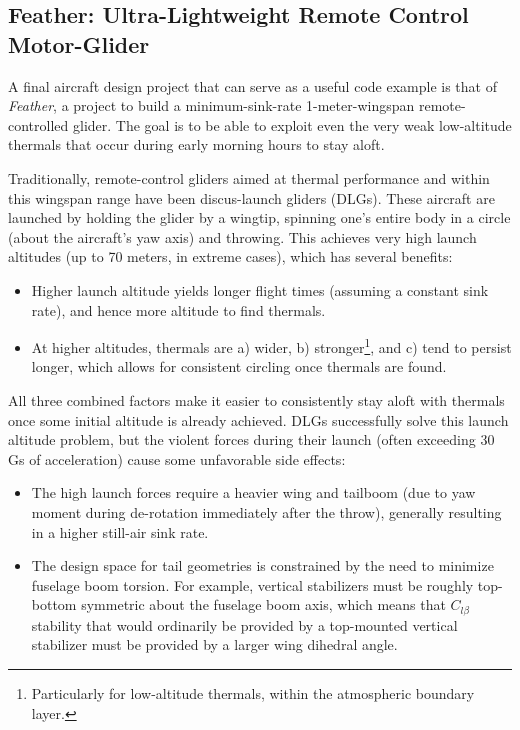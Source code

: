 \subsection{Feather: Ultra-Lightweight Remote Control Motor-Glider}
\label{sec:feather}

A final aircraft design project that can serve as a useful code example is that of \emph{Feather}, a project to build a minimum-sink-rate 1-meter-wingspan remote-controlled glider. The goal is to be able to exploit even the very weak low-altitude thermals that occur during early morning hours to stay aloft.

Traditionally, remote-control gliders aimed at thermal performance and within this wingspan range have been discus-launch gliders (DLGs). These aircraft are launched by holding the glider by a wingtip, spinning one's entire body in a circle (about the aircraft's yaw axis) and throwing. This achieves very high launch altitudes (up to 70 meters, in extreme cases), which has several benefits:
\begin{itemize}[noitemsep]
    \item Higher launch altitude yields longer flight times (assuming a constant sink rate), and hence more altitude to find thermals.
    \item At higher altitudes, thermals are a) wider, b) stronger\footnote{Particularly for low-altitude thermals, within the atmospheric boundary layer.}, and c) tend to persist longer, which allows for consistent circling once thermals are found.
\end{itemize}

All three combined factors make it easier to consistently stay aloft with thermals once some initial altitude is already achieved. DLGs successfully solve this launch altitude problem, but the violent forces during their launch (often exceeding 30 Gs of acceleration) cause some unfavorable side effects:

\begin{itemize}[noitemsep]
    \item The high launch forces require a heavier wing and tailboom (due to yaw moment during de-rotation immediately after the throw), generally resulting in a higher still-air sink rate.
    \item The design space for tail geometries is constrained by the need to minimize fuselage boom torsion. For example, vertical stabilizers must be roughly top-bottom symmetric about the fuselage boom axis, which means that $C_{l\beta}$ stability that would ordinarily be provided by a top-mounted vertical stabilizer must be provided by a larger wing dihedral angle.
\end{itemize}

